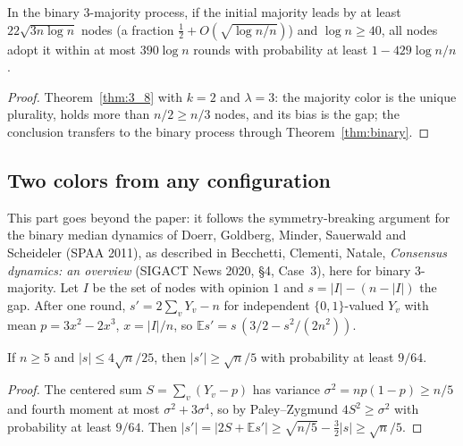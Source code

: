 \begin{corollary}\label{cor:binary_vanishing}
  \leanok
  In the binary 3-majority process, if the initial majority leads by at least
  $22\sqrt{3n\log n}$ nodes (a fraction $\frac12 + O(\sqrt{\log n/n})$) and $\log n \ge 40$,
  all nodes adopt it within at most $390\log n$ rounds with probability at least
  $1 - 429\log n/n$.
\end{corollary}
\begin{proof}
  \leanok
  Theorem~\ref{thm:3_8} with $k = 2$ and $\lambda = 3$: the majority color is the unique
  plurality, holds more than $n/2 \ge n/3$ nodes, and its bias is the gap; the conclusion
  transfers to the binary process through Theorem~\ref{thm:binary}.
\end{proof}

\subsection{Two colors from any configuration}\label{sec:any_start}

This part goes beyond the paper: it follows the symmetry-breaking argument for the binary
median dynamics of Doerr, Goldberg, Minder, Sauerwald and Scheideler (SPAA 2011), as described in
Becchetti, Clementi, Natale, \emph{Consensus dynamics: an overview} (SIGACT News 2020, \S4,
Case~3), here for binary 3-majority. Let $I$ be the set of nodes with opinion $1$ and
$s = |I| - (n - |I|)$ the gap. After one round, $s' = 2\sum_v Y_v - n$ for independent
$\{0,1\}$-valued $Y_v$ with mean $p = 3x^2 - 2x^3$, $x = |I|/n$, so
$\mathbb{E}s' = s\,(3/2 - s^2/(2n^2))$.

\begin{lemma}\label{lem:jump_near_balance}
  \leanok
  If $n \ge 5$ and $|s| \le 4\sqrt n/25$, then $|s'| \ge \sqrt n/5$ with probability at
  least $9/64$.
\end{lemma}
\begin{proof}
  \leanok
  The centered sum $S = \sum_v (Y_v - p)$ has variance $\sigma^2 = np(1-p) \ge n/5$ and fourth
  moment at most $\sigma^2 + 3\sigma^4$, so by Paley--Zygmund $4S^2 \ge \sigma^2$ with
  probability at least $9/64$. Then $|s'| = |2S + \mathbb{E}s'| \ge \sqrt{n/5} - \frac32|s|
  \ge \sqrt n/5$.
\end{proof}

